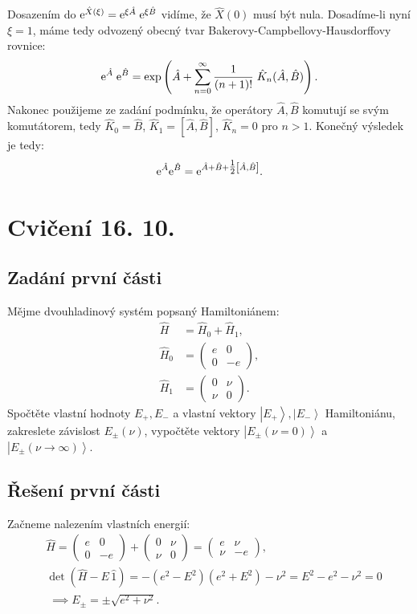 \documentclass[10pt,a4paper]{article}
\newcommand{\comm}[2]{\left[ #1, #2 \right]}
\newcommand{\const}[1]{\text{\rmfamily\upshape #1}}
\newcommand{\mat}[1]{
    \begin{pmatrix}
        #1
    \end{pmatrix}
}
\newcommand{\ket}[1]{\left| #1 \right>}
\newcommand{\e}[1]{\const{e}^{#1}}
\begin{document}
Dosazením do $\e{\hat X(\xi)} = \e{\xi \hat A} \; \e{\xi \hat B}$ vidíme, že $\hat X(0)$ musí být nula. Dosadíme-li nyní $\xi=1$, máme tedy odvozený obecný tvar Bakerovy-Campbellovy-Hausdorffovy rovnice:
\begin{align*}
    \e{\hat A} \; \e{\hat B} = \exp \left(
        \hat A + \sum_{n=0}^\infty \frac{1}{(n+1)!} \; \hat K_n(\hat A, \hat B)
    \right).
\end{align*}
Nakonec použijeme ze zadání podmínku, že operátory $\hat A, \hat B$ komutují se svým komutátorem, tedy $\hat K_0 = \hat B$, $\hat K_1 = \comm{\hat A}{\hat B}$, $\hat K_n = 0$ pro $n>1$. Konečný výsledek je tedy:
\begin{align*}
    \e{\hat A}\e{\hat B} = \e{\hat A + \hat B + \tfrac{1}{2} \comm{\hat A}{\hat B}}.
\end{align*}


\pagebreak
\section{Cvičení 16. 10.}

\subsection{Zadání první části}
Mějme dvouhladinový systém popsaný Hamiltoniánem:
\begin{align*}
    \hat H &= \hat H_0 + \hat H_1,
    \\[5pt]
    \hat H_0 &= \mat{e & 0 \\ 0 & -e},
    \\[5pt]
    \hat H_1 &= \mat{0 & \nu \\ \nu & 0}.
\end{align*}
Spočtěte vlastní hodnoty $E_{+}, E_{-}$ a vlastní vektory $\ket{E_{+}}, \ket{E_{-}}$ Hamiltoniánu, zakreslete závislost $E_{\pm}(\nu)$, vypočtěte vektory $\ket{E_{\pm}(\nu=0)}$ a $\ket{E_{\pm}(\nu\to\infty)}$.

\subsection{Řešení první části}
Začneme nalezením vlastních energií:
\begin{align*}
    &\hat H
    = \mat{ e & 0 \\ 0 & -e } + \mat{ 0 & \nu \\ \nu & 0 }
    = \mat{ e & \nu \\ \nu & -e },
    \\[15pt]
    &\det\left( \hat H - E \, \hat 1 \right)
    = -\left( e^2 - E^2 \right) \left( e^2 + E^2 \right) - \nu^2
    = E^2 - e^2 - \nu^2
    = 0
    \\
    & \; \implies E_{\pm} = \pm \sqrt{ e^2 + \nu^2 }.
    \\
\end{align*}
\end{document}

